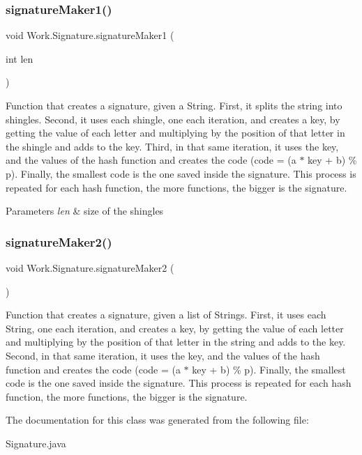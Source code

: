 \subsubsection{\texorpdfstring{signature\+Maker1()}{signatureMaker1()}}
{\footnotesize\ttfamily void Work.\+Signature.\+signature\+Maker1 (\begin{DoxyParamCaption}\item[{int}]{len }\end{DoxyParamCaption})\hspace{0.3cm}{\ttfamily [inline]}}

Function that creates a signature, given a String. First, it splits the string into shingles. Second, it uses each shingle, one each iteration, and creates a key, by getting the value of each letter and multiplying by the position of that letter in the shingle and adds to the key. Third, in that same iteration, it uses the key, and the values of the hash function and creates the code (code = (a $\ast$ key + b) \% p). Finally, the smallest code is the one saved inside the signature. This process is repeated for each hash function, the more functions, the bigger is the signature. 
\begin{DoxyParams}{Parameters}
{\em len} & size of the shingles \\
\hline
\end{DoxyParams}
\mbox{\label{classWork_1_1Signature_aa9ef78ee15edc026f57350b1ee67034a}} 
\subsubsection{\texorpdfstring{signature\+Maker2()}{signatureMaker2()}}
{\footnotesize\ttfamily void Work.\+Signature.\+signature\+Maker2 (\begin{DoxyParamCaption}{ }\end{DoxyParamCaption})\hspace{0.3cm}{\ttfamily [inline]}}

Function that creates a signature, given a list of Strings. First, it uses each String, one each iteration, and creates a key, by getting the value of each letter and multiplying by the position of that letter in the string and adds to the key. Second, in that same iteration, it uses the key, and the values of the hash function and creates the code (code = (a $\ast$ key + b) \% p). Finally, the smallest code is the one saved inside the signature. This process is repeated for each hash function, the more functions, the bigger is the signature. 

The documentation for this class was generated from the following file\+:\begin{DoxyCompactItemize}
\item 
Signature.\+java\end{DoxyCompactItemize}
